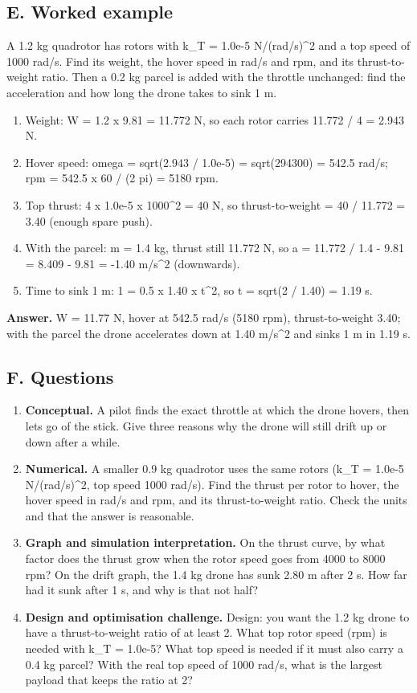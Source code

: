 \documentclass[11pt,a4paper]{article}
\begin{document}
\subsection*{E. Worked example}
A 1.2 kg quadrotor has rotors with k\_T = 1.0e-5 N/(rad/s)\textasciicircum{}2 and a top speed of 1000 rad/s. Find its weight, the hover speed in rad/s and rpm, and its thrust-to-weight ratio. Then a 0.2 kg parcel is added with the throttle unchanged: find the acceleration and how long the drone takes to sink 1 m.
\begin{enumerate}[nosep]
\item Weight: W = 1.2 x 9.81 = 11.772 N, so each rotor carries 11.772 / 4 = 2.943 N.
\item Hover speed: omega = sqrt(2.943 / 1.0e-5) = sqrt(294300) = 542.5 rad/s; rpm = 542.5 x 60 / (2 pi) = 5180 rpm.
\item Top thrust: 4 x 1.0e-5 x 1000\textasciicircum{}2 = 40 N, so thrust-to-weight = 40 / 11.772 = 3.40 (enough spare push).
\item With the parcel: m = 1.4 kg, thrust still 11.772 N, so a = 11.772 / 1.4 - 9.81 = 8.409 - 9.81 = -1.40 m/s\textasciicircum{}2 (downwards).
\item Time to sink 1 m: 1 = 0.5 x 1.40 x t\textasciicircum{}2, so t = sqrt(2 / 1.40) = 1.19 s.
\end{enumerate}
\textbf{Answer.} W = 11.77 N, hover at 542.5 rad/s (5180 rpm), thrust-to-weight 3.40; with the parcel the drone accelerates down at 1.40 m/s\textasciicircum{}2 and sinks 1 m in 1.19 s.

\subsection*{F. Questions}
\begin{enumerate}[nosep]
\item \textbf{Conceptual.} A pilot finds the exact throttle at which the drone hovers, then lets go of the stick. Give three reasons why the drone will still drift up or down after a while.
\item \textbf{Numerical.} A smaller 0.9 kg quadrotor uses the same rotors (k\_T = 1.0e-5 N/(rad/s)\textasciicircum{}2, top speed 1000 rad/s). Find the thrust per rotor to hover, the hover speed in rad/s and rpm, and its thrust-to-weight ratio. Check the units and that the answer is reasonable.
\item \textbf{Graph and simulation interpretation.} On the thrust curve, by what factor does the thrust grow when the rotor speed goes from 4000 to 8000 rpm? On the drift graph, the 1.4 kg drone has sunk 2.80 m after 2 s. How far had it sunk after 1 s, and why is that not half?
\item \textbf{Design and optimisation challenge.} Design: you want the 1.2 kg drone to have a thrust-to-weight ratio of at least 2. What top rotor speed (rpm) is needed with k\_T = 1.0e-5? What top speed is needed if it must also carry a 0.4 kg parcel? With the real top speed of 1000 rad/s, what is the largest payload that keeps the ratio at 2?
\end{enumerate}
\end{document}
